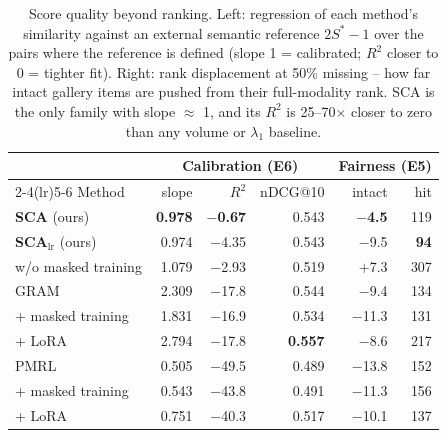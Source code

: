 \begin{table}[t]
\centering
\caption{Score quality beyond ranking. Left: regression of each method's similarity
against an external semantic reference $2S^{*}\!-\!1$ over the pairs where the reference
is defined (slope 1 = calibrated; $R^2$ closer to 0 = tighter fit). Right: rank
displacement at 50\% missing -- how far intact gallery items are pushed from their
full-modality rank. SCA is the only family with slope $\approx$ 1, and its $R^2$ is
25--70$\times$ closer to zero than any volume or $\lambda_1$ baseline.}
\label{tab:calib}
\small
\begin{tabular}{lrrrrr}
\toprule
 & \multicolumn{3}{c}{Calibration (E6)} & \multicolumn{2}{c}{Fairness (E5)} \\
\cmidrule(lr){2-4}\cmidrule(lr){5-6}
Method & slope & $R^2$ & nDCG@10 & intact & hit \\
\midrule
\textbf{SCA} (ours) & \textbf{0.978} & \textbf{$-$0.67} & 0.543 & \textbf{$-$4.5} & 119 \\
\textbf{SCA}$_{\text{lr}}$ (ours) & 0.974 & $-$4.35 & 0.543 & $-$9.5 & \textbf{94} \\
\quad w/o masked training & 1.079 & $-$2.93 & 0.519 & $+$7.3 & 307 \\
\midrule
GRAM & 2.309 & $-$17.8 & 0.544 & $-$9.4 & 134 \\
\quad + masked training & 1.831 & $-$16.9 & 0.534 & $-$11.3 & 131 \\
\quad + LoRA & 2.794 & $-$17.8 & \textbf{0.557} & $-$8.6 & 217 \\
\midrule
PMRL & 0.505 & $-$49.5 & 0.489 & $-$13.8 & 152 \\
\quad + masked training & 0.543 & $-$43.8 & 0.491 & $-$11.3 & 156 \\
\quad + LoRA & 0.751 & $-$40.3 & 0.517 & $-$10.1 & 137 \\
\bottomrule
\end{tabular}
\end{table}
